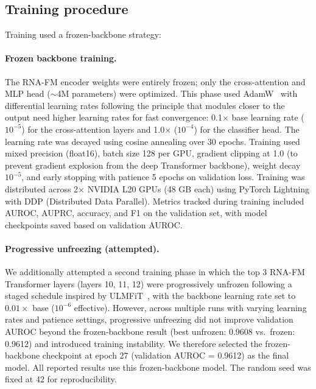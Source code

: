 \documentclass[10pt,a4paper]{article}
\begin{document}
\subsection{Training procedure}

Training used a frozen-backbone strategy:

\paragraph{Frozen backbone training.} The RNA-FM encoder weights were entirely frozen; only the cross-attention and MLP head ($\sim$4M parameters) were optimized. This phase used AdamW~\citep{loshchilov2019adamw} with differential learning rates following the principle that modules closer to the output need higher learning rates for fast convergence: 0.1$\times$ base learning rate ($10^{-5}$) for the cross-attention layers and 1.0$\times$ ($10^{-4}$) for the classifier head. The learning rate was decayed using cosine annealing over 30 epochs. Training used mixed precision (float16), batch size 128 per GPU, gradient clipping at 1.0 (to prevent gradient explosion from the deep Transformer backbone), weight decay $10^{-5}$, and early stopping with patience 5 epochs on validation loss. Training was distributed across 2$\times$ NVIDIA L20 GPUs (48 GB each) using PyTorch Lightning with DDP (Distributed Data Parallel). Metrics tracked during training included AUROC, AUPRC, accuracy, and F1 on the validation set, with model checkpoints saved based on validation AUROC.

\paragraph{Progressive unfreezing (attempted).} We additionally attempted a second training phase in which the top 3 RNA-FM Transformer layers (layers 10, 11, 12) were progressively unfrozen following a staged schedule inspired by ULMFiT~\citep{howard2018ulmfit}, with the backbone learning rate set to $0.01\times$ base ($10^{-6}$ effective). However, across multiple runs with varying learning rates and patience settings, progressive unfreezing did not improve validation AUROC beyond the frozen-backbone result (best unfrozen: 0.9608 vs.\ frozen: 0.9612) and introduced training instability. We therefore selected the frozen-backbone checkpoint at epoch 27 (validation AUROC = 0.9612) as the final model. All reported results use this frozen-backbone model. The random seed was fixed at 42 for reproducibility.
\end{document}
